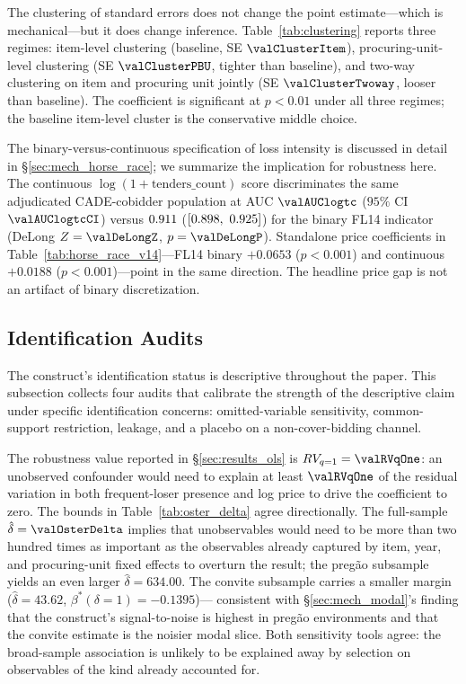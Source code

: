 The clustering of standard errors does not change the point
estimate---which is mechanical---but it does change inference.
Table~\ref{tab:clustering} reports three regimes:
item-level clustering (baseline, SE $\valClusterItem$),
procuring-unit-level clustering (SE $\valClusterPBU$, tighter
than baseline), and two-way \citet{cameron2011robust} clustering
on item and procuring unit jointly (SE $\valClusterTwoway$,
looser than baseline). The coefficient is
significant at $p<0.01$ under all three regimes; the baseline
item-level cluster is the conservative middle choice.

The binary-versus-continuous specification of loss intensity is
discussed in detail in §\ref{sec:mech_horse_race}; we summarize
the implication for robustness here. The continuous
$\log(1+\text{tenders\_count})$ score discriminates the same
adjudicated CADE-cobidder population at AUC
$\valAUClogtc$ ($95\%$ CI $\valAUClogtcCI$) versus
$0.911$ ($[0.898,\ 0.925]$) for the binary
FL14 indicator (DeLong $Z = \valDeLongZ$, $p = \valDeLongP$).
Standalone price coefficients in
Table~\ref{tab:horse_race_v14}---FL14 binary $+0.0653$ ($p<0.001$)
and continuous $+0.0188$ ($p<0.001$)---point in the same direction.
The headline price gap is not an artifact of binary discretization.

\subsection{Identification Audits}
\label{sec:rob_identification}

The construct's identification status is descriptive throughout the
paper. This subsection collects four audits that calibrate the
strength of the descriptive claim under specific identification
concerns: omitted-variable sensitivity, common-support restriction,
leakage, and a placebo on a non-cover-bidding channel.

The \citet{cinelli2020making} robustness value reported in
§\ref{sec:results_ols} is $RV_{q=1} = \valRVqOne$: an unobserved
confounder would need to explain at least $\valRVqOne$ of the
residual variation in both frequent-loser presence and log price to
drive the coefficient to zero. The
\citet{oster2019unobservable} bounds in
Table~\ref{tab:oster_delta} agree directionally. The full-sample
$\hat{\delta} = \valOsterDelta$ implies that unobservables would need to be
more than two hundred times as important as the observables already
captured by item, year, and procuring-unit fixed effects to overturn
the result; the preg\~ao subsample yields an even larger
$\hat{\delta} = 634.00$. The convite subsample carries a smaller
margin ($\hat{\delta} = 43.62$, $\beta^*(\delta=1) = -0.1395$)---
consistent with §\ref{sec:mech_modal}'s finding that the
construct's signal-to-noise is highest in preg\~ao environments and
that the convite estimate is the noisier modal slice. Both
sensitivity tools agree: the broad-sample association is unlikely to
be explained away by selection on observables of the kind already
accounted for.

